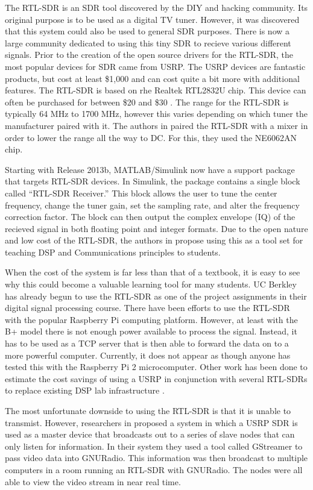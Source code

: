 	The RTL-SDR is an SDR tool discovered by the DIY and hacking community. Its original purpose is to be used as a digital TV tuner. However, it was discovered that this system could also be used to general SDR purposes. There is now a large community dedicated to using this tiny SDR to recieve various different signals. Prior to the creation of the open source drivers for the RTL-SDR, the most popular devices for SDR came from USRP. The USRP devices are fantastic products, but cost at least \$1,000 and can cost quite a bit more with additional features. The RTL-SDR is based on rhe Realtek RTL2832U chip. This device can often be purchased for between \$20 and \$30 \cite{6526525}. The range for the RTL-SDR is typically 64 MHz	to 1700 MHz, however this varies depending on which tuner the manufacturer paired with it. The authors in \cite{6526525} paired the RTL-SDR with a mixer in order to lower the range all the way to DC. For this, they used the NE6062AN chip.  
	
	Starting with Release 2013b, MATLAB/Simulink now have a support package that targets RTL-SDR devices. In Simulink, the package contains a single block called ``RTL-SDR Receiver.'' This block allows the user to tune the center frequency, change the tuner gain, set the sampling rate, and alter the frequency correction factor. The block can then output the complex envelope (IQ) of the recieved signal in both floating point and integer formats\cite{6893337}.  Due to the open nature and low cost of the RTL-SDR, the authors in \cite{6821718} propose using this as a tool set for teaching DSP and Communications principles to students. 
	
	When the cost of the system is far less than that of a
	textbook, it is easy to see why this could become a valuable learning tool for many students. UC Berkley has already begun to use the RTL-SDR as one of the project assignments in their digital signal processing course. 	There have been efforts to use the RTL-SDR with the popular Raspberry Pi computing platform. However, at least with the B+ model there is not enough power available to process the signal. Instead, it has to be used as a TCP server that is then able to forward the data on to a more powerful computer\cite{6938691}. Currently, it does not appear as though anyone has tested this with the Raspberry Pi 2 microcomputer. Other work has been done to estimate the cost savings of using a USRP in conjunction with several RTL-SDRs to replace existing DSP lab infrastructure \cite{6726630}. 
	
	The most unfortunate downside to using the RTL-SDR is that it is unable to transmist. However, researchers in \cite{6922233} proposed a system in which a USRP SDR is used as a master device that broadcasts out to a series of slave nodes that can only listen for information. In their system they used a tool called GStreamer to pass video data into GNURadio. This information was then broadcast to multiple computers in a room running an RTL-SDR with GNURadio. The nodes were all able to view the video stream in near real time.  


